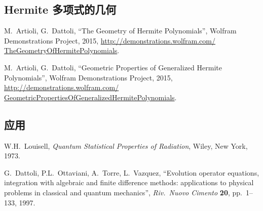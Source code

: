 \subsection*{Hermite 多项式的几何}
\begin{enumerate}[label={[\arabic*]},start=20]
\item M.~Artioli, G.~Dattoli,
      ``The Geometry of Hermite Polynomials'',
      Wolfram Demonstrations Project, 2015,
      \url{http://demonstrations.wolfram.com/
      TheGeometryOfHermitePolynomials}.
\item M.~Artioli, G.~Dattoli,
      ``Geometric Properties of Generalized Hermite
      Polynomials'', Wolfram Demonstrations Project, 2015,
      \url{http://demonstrations.wolfram.com/
      GeometricPropertiesOfGeneralizedHermitePolynomials}.
\end{enumerate}

\subsection*{应用}
\begin{enumerate}[label={[\arabic*]},start=22]
\item W.H.~Louisell, \emph{Quantum Statistical Properties of
      Radiation}, Wiley, New York, 1973.
\item G.~Dattoli, P.L.~Ottaviani, A.~Torre, L.~Vazquez,
      ``Evolution operator equations, integration with
      algebraic and finite difference methods: applications
      to physical problems in classical and quantum
      mechanics'', \emph{Riv.\ Nuovo Cimento} \textbf{20},
      pp.~1--133, 1997.
\end{enumerate}

